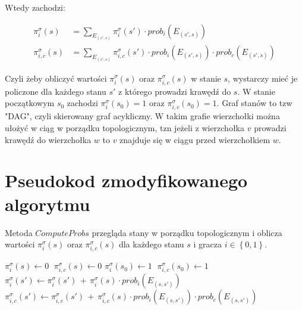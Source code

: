 \documentclass[licencjacka]{pracamgr}
\begin{document}
\noindent
Wtedy zachodzi:

\begin{align*}
\pi_i^{\sigma}(s) &= \sum\limits_{E_{(s', s)}} \pi_i^{\sigma}(s') \cdot prob_i(E_{(s', s)}) \\
\pi_{i, c}^{\sigma}(s) &= \sum\limits_{E_{(s', s)}} \pi_{i, c}^{\sigma}(s') \cdot prob_i(E_{(s', s)}) \cdot prob_c(E_{(s', s)})
\end{align*}

\noindent
Czyli żeby obliczyć wartości $\pi_i^{\sigma}(s)$ oraz $\pi_{i, c}^{\sigma}(s)$ w stanie $s$, wystarczy
mieć je policzone dla każdego stanu $s'$ z którego prowadzi krawędź do $s$. W stanie początkowym $s_0$ zachodzi
$\pi_i^{\sigma}(s_0) = 1$ oraz $\pi_{i, c}^{\sigma}(s_0) = 1$. Graf stanów to tzw "DAG", czyli
skierowany graf acykliczny. W takim grafie wierzchołki można ułożyć w ciąg w porządku topologicznym, tzn
jeżeli z wierzchołka $v$ prowadzi krawędź do wierzchołka $w$ to $v$ znajduje się w ciągu przed wierzchołkiem $w$.

\section{Pseudokod zmodyfikowanego algorytmu}

\noindent
Metoda $ComputeProbs$ przegląda stany w porządku topologicznym i oblicza wartości $\pi_i^{\sigma}(s)$ oraz $\pi_{i, c}^{\sigma}(s)$
dla każdego stanu $s$ i gracza $i \in \left\{0, 1\right\}$. \\ 

\begin{algorithmic}
        \State $\pi_i^{\sigma}(s) \gets 0$ $ \; \pi_{i,c}^{\sigma}(s) \gets 0$
        \State $\pi_i^{\sigma}(s_0) \gets 1$ $ \; \pi_{i,c}^{\sigma}(s_0) \gets 1$
                \State $\pi_i^{\sigma}(s') \gets \pi_i^{\sigma}(s') \, + \, \pi_i^{\sigma}(s) \cdot prob_i(E_{(s, s')})$ 
                \State $\pi_{i,c}^{\sigma}(s') \gets \pi_{i,c}^{\sigma}(s') \, + \, \pi_{i,c}^{\sigma}(s) \cdot prob_i(E_{(s, s')}) \cdot prob_c(E_{(s, s')})$ 
            \EndFor
        \EndFor
    \EndFunction
\end{algorithmic}
\end{document}
